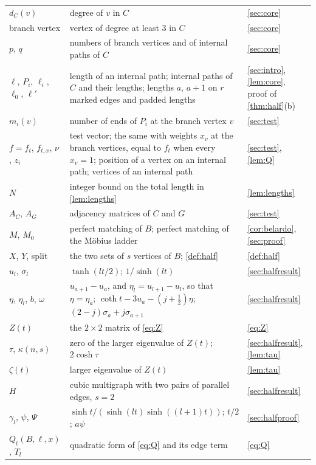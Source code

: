 \documentclass[11pt]{article}
\theoremstyle{definition}
\theoremstyle{remark}
\begin{document}
{\begin{longtable}{l>{\raggedright\arraybackslash}p{}>{\raggedright\arraybackslash}p{}}
$d_C(v)$ & degree of $v$ in $C$ & \cref{sec:core}\\
branch vertex & vertex of degree at least $3$ in $C$ & \cref{sec:core}\\
$p$, $q$ & numbers of branch vertices and of internal paths of $C$ & \cref{sec:core}\\
$\ell$, $P_i$, $\ell_i$, $\ell_0$, $\ell'$ & length of an internal path; internal paths of $C$ and their lengths; lengths $a$, $a+1$ on $r$ marked edges and padded lengths & \cref{sec:intro}, \cref{lem:core}, proof of \cref{thm:half}(b)\\
$m_i(v)$ & number of ends of $P_i$ at the branch vertex $v$ & \cref{sec:test}\\
$f=f_t$, $f_{t,x}$, $\nu$, $z_i$ & test vector; the same with weights $x_v$ at the branch vertices, equal to $f_t$ when every $x_v=1$; position of a vertex on an internal path; vertices of an internal path & \cref{sec:test}, \cref{lem:Q}\\
$N$ & integer bound on the total length in \cref{lem:lengths} & \cref{lem:lengths}\\
$A_C$, $A_G$ & adjacency matrices of $C$ and $G$ & \cref{sec:test}\\
$M$, $M_0$ & perfect matching of $B$; perfect matching of the M\"obius ladder & \cref{cor:belardo}, \cref{sec:proof}\\
$X$, $Y$, split & the two sets of $s$ vertices of $B$; \cref{def:half} & \cref{def:half}\\
$u_l$, $\sigma_l$ & $\tanh(lt/2)$; $1/\sinh(lt)$ & \cref{sec:halfresult}\\
$\eta$, $\eta_l$, $b$, $\omega$ & $u_{a+1}-u_a$, and $\eta_l=u_{l+1}-u_l$, so that $\eta=\eta_a$; $\coth t-3u_a-(j+\frac12)\eta$; $(2-j)\sigma_a+j\sigma_{a+1}$ & \cref{sec:halfresult}\\
$Z(t)$ & the $2\times2$ matrix of \eqref{eq:Z} & \eqref{eq:Z}\\
$\tau$, $\kappa(n,s)$ & zero of the larger eigenvalue of $Z(t)$; $2\cosh\tau$ & \cref{sec:halfresult}, \cref{lem:tau}\\
$\zeta(t)$ & larger eigenvalue of $Z(t)$ & \cref{lem:tau}\\
$H$ & cubic multigraph with two pairs of parallel edges, $s=2$ & \cref{sec:halfresult}\\
$\gamma_l$, $\psi$, $\Psi$ & $\sinh t/(\sinh(lt)\sinh((l+1)t))$; $t/2$; $a\psi$ & \cref{sec:halfproof}\\
$Q_t(B,\ell,x)$, $T_l$ & quadratic form of \eqref{eq:Q} and its edge term & \eqref{eq:Q}\\

\end{longtable}}
\end{document}
